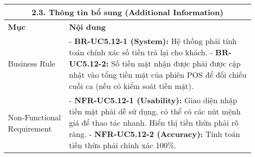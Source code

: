 \begin{longtable}{|m{4cm}|p{11cm}|}
\hline
\multicolumn{2}{|c|}{\textbf{2.3. Thông tin bổ sung (Additional Information)}} \\
\hline
\textbf{Mục} & \textbf{Nội dung} \\
\hline
Business Rule & - \textbf{BR-UC5.12-1 (System):} Hệ thống phải tính toán chính xác số tiền trả lại cho khách. \newline - \textbf{BR-UC5.12-2:} Số tiền mặt nhận được phải được cập nhật vào tổng tiền mặt của phiên POS để đối chiếu cuối ca (nếu có kiểm soát tiền mặt). \\
\hline
Non-Functional Requirement & - \textbf{NFR-UC5.12-1 (Usability):} Giao diện nhập tiền mặt phải dễ sử dụng, có thể có các nút mệnh giá để thao tác nhanh. Hiển thị tiền thừa phải rõ ràng. \newline - \textbf{NFR-UC5.12-2 (Accuracy):} Tính toán tiền thừa phải chính xác 100\%. \\
\hline
\end{longtable}

